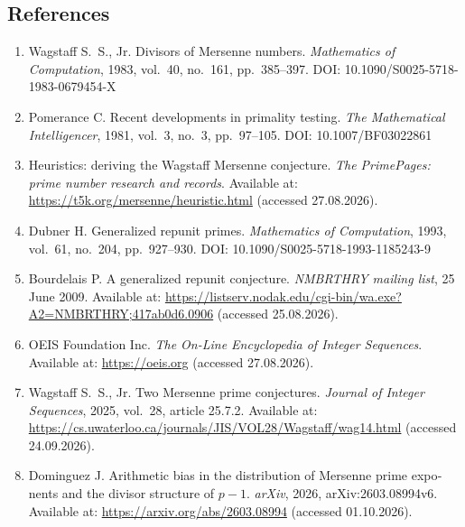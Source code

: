 \documentclass[11pt,a4paper]{article}
\theoremstyle{plain}
\theoremstyle{remark}
\begin{document}
\begin{otherlanguage}{english}
\section*{References}
\begin{enumerate}\itemsep2pt
\item Wagstaff S.~S., Jr. Divisors of Mersenne numbers.
\emph{Mathematics of Computation}, 1983, vol.~40, no.~161, pp.~385--397.
DOI: 10.1090/S0025-5718-1983-0679454-X

\item Pomerance C. Recent developments in primality testing.
\emph{The Mathematical Intelligencer}, 1981, vol.~3, no.~3, pp.~97--105.
DOI: 10.1007/BF03022861

\item Heuristics: deriving the Wagstaff Mersenne conjecture. \emph{The PrimePages:
prime number research and records}. Available at:
\url{https://t5k.org/mersenne/heuristic.html} (accessed 27.08.2026).

\item Dubner H. Generalized repunit primes.
\emph{Mathematics of Computation}, 1993, vol.~61, no.~204, pp.~927--930.
DOI: 10.1090/S0025-5718-1993-1185243-9

\item Bourdelais P. A generalized repunit conjecture. \emph{NMBRTHRY mailing
list}, 25 June 2009. Available at:
\url{https://listserv.nodak.edu/cgi-bin/wa.exe?A2=NMBRTHRY;417ab0d6.0906}
(accessed 25.08.2026).

\item OEIS Foundation Inc. \emph{The On-Line Encyclopedia of Integer
Sequences}. Available at: \url{https://oeis.org} (accessed 27.08.2026).

\item Wagstaff S.~S., Jr. Two Mersenne prime conjectures.
\emph{Journal of Integer Sequences}, 2025, vol.~28, article 25.7.2.
Available at:
\url{https://cs.uwaterloo.ca/journals/JIS/VOL28/Wagstaff/wag14.html}
(accessed 24.09.2026).

\item Dominguez J. Arithmetic bias in the distribution of Mersenne prime exponents
and the divisor structure of $p-1$. \emph{arXiv}, 2026, arXiv:2603.08994v6. Available
at: \url{https://arxiv.org/abs/2603.08994} (accessed 01.10.2026).


\end{enumerate}
\end{otherlanguage}
\end{document}
